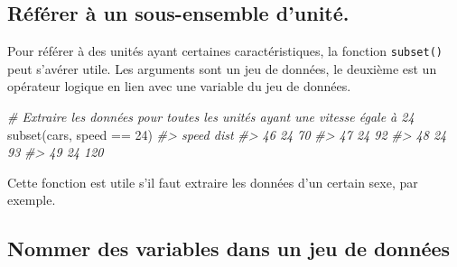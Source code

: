 \documentclass[
]{book}
\newenvironment{Shaded}{}{}
\newcommand{\CommentTok}[1]{\textit{#1}}
\newcommand{\DecValTok}[1]{#1}
\newcommand{\FunctionTok}[1]{#1}
\newcommand{\NormalTok}[1]{#1}
\newcommand{\SpecialCharTok}[1]{#1}
\newcommand{\StringTok}[1]{#1}
\begin{document}
\begin{Shaded}
\end{Shaded}

\hypertarget{ruxe9fuxe9rer-uxe0-un-sous-ensemble-dunituxe9.}{%
\subsection{Référer à un sous-ensemble d'unité.}\label{ruxe9fuxe9rer-uxe0-un-sous-ensemble-dunituxe9.}}

Pour référer à des unités ayant certaines caractéristiques, la fonction \texttt{subset()} peut s'avérer utile. Les arguments sont un jeu de données, le deuxième est un opérateur logique en lien avec une variable du jeu de données.

\begin{Shaded}
\begin{Highlighting}[]
\CommentTok{\# Extraire les données pour toutes les unités ayant une vitesse égale à 24}
\FunctionTok{subset}\NormalTok{(cars, speed }\SpecialCharTok{==} \DecValTok{24}\NormalTok{)}
\CommentTok{\#\textgreater{}    speed dist}
\CommentTok{\#\textgreater{} 46    24   70}
\CommentTok{\#\textgreater{} 47    24   92}
\CommentTok{\#\textgreater{} 48    24   93}
\CommentTok{\#\textgreater{} 49    24  120}
\end{Highlighting}
\end{Shaded}

Cette fonction est utile s'il faut extraire les données d'un certain sexe, par exemple.

\hypertarget{nommer-des-variables-dans-un-jeu-de-donnuxe9es}{%
\subsection{Nommer des variables dans un jeu de données}\label{nommer-des-variables-dans-un-jeu-de-donnuxe9es}}
\end{document}
